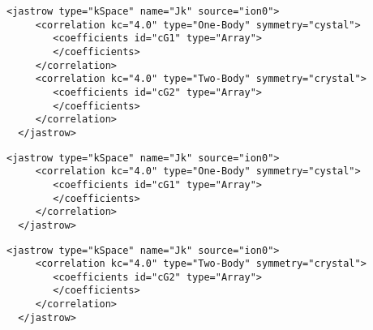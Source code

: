 \begin{lstlisting}[caption=k-space Jastrow with one- and two-body terms.]
  <jastrow type="kSpace" name="Jk" source="ion0">
     <correlation kc="4.0" type="One-Body" symmetry="cystal">
        <coefficients id="cG1" type="Array">                  
        </coefficients>
     </correlation>
     <correlation kc="4.0" type="Two-Body" symmetry="crystal">
        <coefficients id="cG2" type="Array">                  
        </coefficients>
     </correlation>
  </jastrow>
\end{lstlisting}

\begin{lstlisting}[caption=k-space Jastrow with one-body term only.]
  <jastrow type="kSpace" name="Jk" source="ion0">
     <correlation kc="4.0" type="One-Body" symmetry="cystal">
        <coefficients id="cG1" type="Array">                  
        </coefficients>
     </correlation>
  </jastrow>
\end{lstlisting}

\begin{lstlisting}[caption=k-space Jastrow with two-body term only.]
  <jastrow type="kSpace" name="Jk" source="ion0">
     <correlation kc="4.0" type="Two-Body" symmetry="crystal">
        <coefficients id="cG2" type="Array">                  
        </coefficients>
     </correlation>
  </jastrow>
\end{lstlisting}


